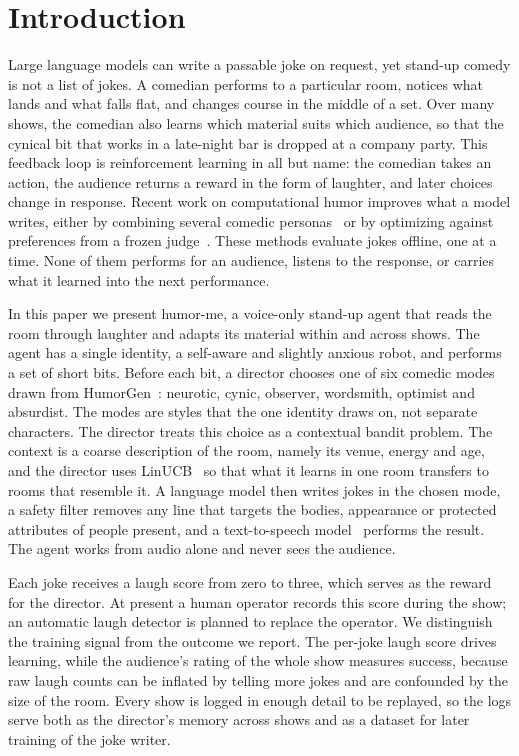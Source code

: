 \section{Introduction}
\label{sec:intro}

Large language models can write a passable joke on request, yet stand-up comedy is not a list of jokes. A comedian performs to a particular room, notices what lands and what falls flat, and changes course in the middle of a set. Over many shows, the comedian also learns which material suits which audience, so that the cynical bit that works in a late-night bar is dropped at a company party. This feedback loop is reinforcement learning in all but name: the comedian takes an action, the audience returns a reward in the form of laughter, and later choices change in response. Recent work on computational humor improves what a model writes, either by combining several comedic personas~\cite{humorgen} or by optimizing against preferences from a frozen judge~\cite{wang2025lol}. These methods evaluate jokes offline, one at a time. None of them performs for an audience, listens to the response, or carries what it learned into the next performance.

In this paper we present humor-me, a voice-only stand-up agent that reads the room through laughter and adapts its material within and across shows. The agent has a single identity, a self-aware and slightly anxious robot, and performs a set of short bits. Before each bit, a director chooses one of six comedic modes drawn from HumorGen~\cite{humorgen}: neurotic, cynic, observer, wordsmith, optimist and absurdist. The modes are styles that the one identity draws on, not separate characters. The director treats this choice as a contextual bandit problem. The context is a coarse description of the room, namely its venue, energy and age, and the director uses LinUCB~\cite{li2010linucb} so that what it learns in one room transfers to rooms that resemble it. A language model then writes jokes in the chosen mode, a safety filter removes any line that targets the bodies, appearance or protected attributes of people present, and a text-to-speech model~\cite{kokoro} performs the result. The agent works from audio alone and never sees the audience.

Each joke receives a laugh score from zero to three, which serves as the reward for the director. At present a human operator records this score during the show; an automatic laugh detector is planned to replace the operator. We distinguish the training signal from the outcome we report. The per-joke laugh score drives learning, while the audience's rating of the whole show measures success, because raw laugh counts can be inflated by telling more jokes and are confounded by the size of the room. Every show is logged in enough detail to be replayed, so the logs serve both as the director's memory across shows and as a dataset for later training of the joke writer.

